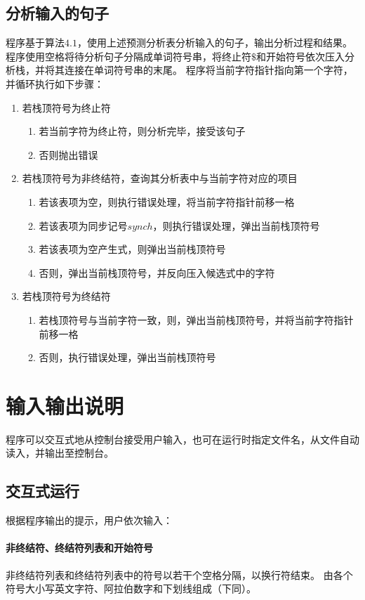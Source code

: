 \documentclass[UTF8]{ctexart}
\begin{document}
\subsection{分析输入的句子}
程序基于算法$4.1$，使用上述预测分析表分析输入的句子，输出分析过程和结果。
程序使用空格将待分析句子分隔成单词符号串，将终止符$\$$和开始符号依次压入分析栈，并将其连接在单词符号串的末尾。
程序将当前字符指针指向第一个字符，并循环执行如下步骤：
\begin{enumerate}
	\item 若栈顶符号为终止符
    \begin{enumerate}
        \item 若当前字符为终止符，则分析完毕，接受该句子
        \item 否则抛出错误
    \end{enumerate}
	\item 若栈顶符号为非终结符，查询其分析表中与当前字符对应的项目
	      \begin{enumerate}
		      \item 若该表项为空，则执行错误处理，将当前字符指针前移一格
		      \item 若该表项为同步记号$synch$，则执行错误处理，弹出当前栈顶符号
		      \item 若该表项为空产生式，则弹出当前栈顶符号
		      \item 否则，弹出当前栈顶符号，并反向压入候选式中的字符
	      \end{enumerate}
    \item 若栈顶符号为终结符
        \begin{enumerate}
            \item 若栈顶符号与当前字符一致，则，弹出当前栈顶符号，并将当前字符指针前移一格
            \item 否则，执行错误处理，弹出当前栈顶符号
        \end{enumerate}
    \end{enumerate}
\section{输入输出说明}
程序可以交互式地从控制台接受用户输入，也可在运行时指定文件名，从文件自动读入，并输出至控制台。
\subsection{交互式运行}
根据程序输出的提示，用户依次输入：
\paragraph{非终结符、终结符列表和开始符号}
非终结符列表和终结符列表中的符号以若干个空格分隔，以换行符结束。
由各个符号大小写英文字符、阿拉伯数字和下划线组成（下同）。
\end{document}
